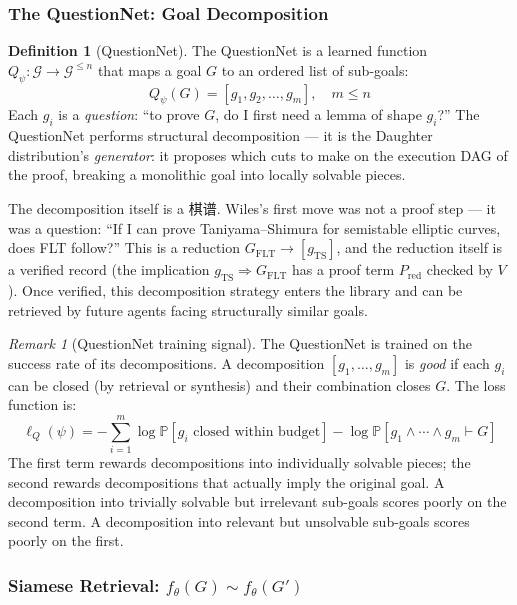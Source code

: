 \documentclass[11pt,a4paper]{article}
\theoremstyle{definition}
\newtheorem{definition}[theorem]{Definition}
\theoremstyle{remark}
\newtheorem{remark}[theorem]{Remark}
\begin{document}
\subsubsection*{The QuestionNet: Goal Decomposition}

\begin{definition}[QuestionNet]\label{def:questionnet}
The QuestionNet is a learned function $Q_\psi: \mathcal{G} \to \mathcal{G}^{\leq n}$ that maps a goal $G$ to an ordered list of sub-goals:
\[
  Q_\psi(G) = [g_1, g_2, \ldots, g_m], \quad m \leq n
\]
Each $g_i$ is a \emph{question}: ``to prove $G$, do I first need a lemma of shape $g_i$?'' The QuestionNet performs structural decomposition --- it is the Daughter distribution's \emph{generator}: it proposes which cuts to make on the execution DAG of the proof, breaking a monolithic goal into locally solvable pieces.
\end{definition}

The decomposition itself is a 棋谱. Wiles's first move was not a proof step --- it was a question: ``If I can prove Taniyama--Shimura for semistable elliptic curves, does FLT follow?'' This is a reduction $G_{\mathrm{FLT}} \to [g_{\mathrm{TS}}]$, and the reduction itself is a verified record (the implication $g_{\mathrm{TS}} \Rightarrow G_{\mathrm{FLT}}$ has a proof term $P_{\mathrm{red}}$ checked by $V$). Once verified, this decomposition strategy enters the library and can be retrieved by future agents facing structurally similar goals.

\begin{remark}[QuestionNet training signal]
The QuestionNet is trained on the success rate of its decompositions. A decomposition $[g_1, \ldots, g_m]$ is \emph{good} if each $g_i$ can be closed (by retrieval or synthesis) and their combination closes $G$. The loss function is:
\[
  \ell_Q(\psi) = -\sum_{i=1}^m \log \mathbb{P}[\text{$g_i$ closed within budget}] - \log \mathbb{P}[g_1 \wedge \cdots \wedge g_m \vdash G]
\]
The first term rewards decompositions into individually solvable pieces; the second rewards decompositions that actually imply the original goal. A decomposition into trivially solvable but irrelevant sub-goals scores poorly on the second term. A decomposition into relevant but unsolvable sub-goals scores poorly on the first.
\end{remark}


\subsubsection*{Siamese Retrieval: $f_\theta(G) \sim f_\theta(G')$}
\end{document}
